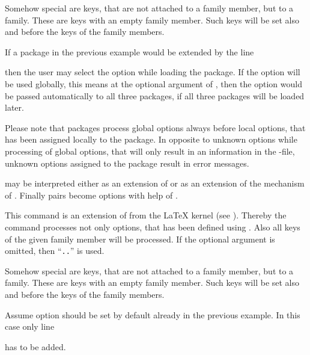 Somehow special are keys, that are not attached to a family member, but to a
family. These are keys with an empty family member. Such keys will be set also
and before the keys of the family members.
\begin{Example}
  If a package in the previous example would be extended by the line
\begin{lstcode}
\end{lstcode}
  then the user may select the option  while loading the
  package. If the option will be used globally, this means at the optional
  argument of , then the option would be passed
  automatically to all three packages, if all three packages will be loaded
  later.
\end{Example}
Please note that packages process global options always
before local options, that has been assigned locally to the package. In
opposite to unknown options while processing of global options, that will only
result in an information in the -file, unknown options assigned to
the package result in error messages.

 may be interpreted either as an extension of
 or as an extension of the  mechanism
of . Finally  pairs become options with help
of .%
%
%


\begin{Declaration}
\end{Declaration}
%
This command is an extension of  from the \LaTeX{}
kernel (see \cite{latex:clsguide}). Thereby the command processes not only
options, that has been defined using . Also all keys of
the given family member will be processed. If the optional argument
 is omitted, then
``\texttt{.}\texttt{.}'' is used.

Somehow special are keys, that are not attached to a family member, but to a
family. These are keys with an empty family member. Such keys will be set also
and before the keys of the family members.
\begin{Example}
  Assume option  should be set by default already in the
  previous example. In this case only line
\begin{lstcode}
\end{lstcode}
  has to be added.
\end{Example}
%
%


